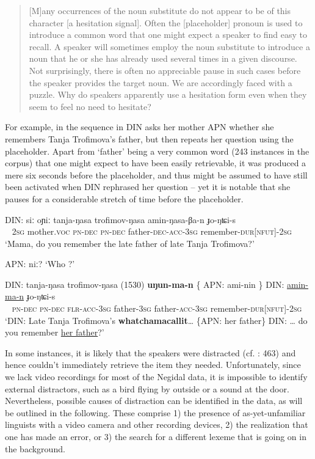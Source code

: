 \documentclass[output=paper]{langscibook}
\begin{document}
\begin{quote}
 [M]any occurrences of the noun substitute do not appear to be of this character [a hesitation signal]. Often the [placeholder] pronoun is used to introduce a common word that one might expect a speaker to find easy to recall. A speaker will sometimes employ the noun substitute to introduce a noun that he or she has already used several times in a given discourse. Not surprisingly, there is often no appreciable pause in such cases before the speaker provides the target noun. We are accordingly faced with a puzzle. Why do speakers apparently use a hesitation form even when they seem to feel no need to hesitate?
\end{quote}

For example, in the sequence in  DIN asks her mother APN whether she remembers Tanja Trofimova’s father, but then repeats her question using the placeholder. Apart from ‘father’ being a very common word (243 instances in the corpus) that one might expect to have been easily retrievable, it was produced a mere six seconds before the placeholder, and thus might be assumed to have still been activated when DIN rephrased her question – yet it is notable that she pauses for a considerable stretch of time before the placeholder. 


\ea \label{ex:pakendorf:48}
\ea
\gll \textup{DIN:}
	siː oɲiː tanja-ŋasa trofimov-ŋasa amin-ŋasa-βa-n ɟo-ŋʨi-s\\
    ~{} \textsc{2sg} mother.\textsc{voc} \textsc{pn-dec} \textsc{pn-dec} father-\textsc{dec-acc-3sg} remember-\textsc{dur[nfut]-2sg}\\
\glt ‘Mama, do you remember the late father of late Tanja Trofimova?’ 

\ex \textup{APN:} niː?
\glt ‘Who ?’

\ex \gll \textup{DIN:}
	tanja-ŋasa
	trofimov-ŋasa
	\textup{(1530)}
	\textbf{uŋun-ma-n}
	\textup{\{}
	\textup{APN:}
	ami-nin
	\textup{\}}
	\textup{DIN:}
	\uline{amin-ma-n} ɟo-ŋʨi-s\\
	 ~{}
     \textsc{pn-dec}
     \textsc{pn-dec}
     {}
     \textsc{flr-acc-3sg}
     {}
     {}
     father-\textsc{3sg}
     {}
     {}
     father-\textsc{acc-3sg}
     remember-\textsc{dur[nfut]-2sg}\\
\glt ‘DIN: Late Tanja Trofimova’s \textbf{whatchamacallit}… \{APN: her father\} DIN: … do you remember \uline{her father}?’ 
\z
\z 

In some instances, it is likely that the speakers were distracted (cf. \citealt{Lickley2015}: 463) and hence couldn’t immediately retrieve the item they needed. Unfortunately, since we lack video recordings for most of the Negidal data, it is impossible to identify external distractors, such as a bird flying by outside or a sound at the door. Nevertheless, possible causes of distraction can be identified in the data, as will be outlined in the following. These comprise 1) the presence of as-yet-unfamiliar linguists with a video camera and other recording devices, 2) the realization that one has made an error, or 3) the search for a different lexeme that is going on in the background. 
\end{document}
